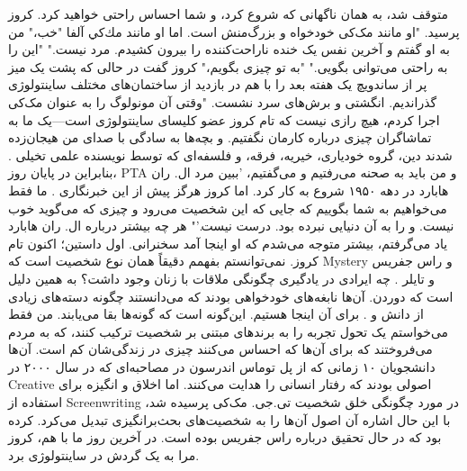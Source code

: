 متوقف شد، به همان ناگهانی که شروع کرد، و شما احساس راحتی خواهید کرد.
کروز پرسید.
"او مانند مک‌کی خودخواه و بزرگ‌منش است. اما او مانند مك‌كي آلفا
"خب،" من به او گفتم و آخرین نفس یک خنده ناراحت‌کننده را بیرون کشیدم.
مرد نیست."
"این را به راحتی می‌توانی بگویی."
"به تو چیزی بگویم،" کروز گفت در حالی که پشت یک میز پر از ساندویچ
یک هفته بعد را با هم در بازدید از ساختمان‌های مختلف ساینتولوژی گذراندیم.
انگشتی و برش‌های سرد نشست. "وقتی آن مونولوگ را به عنوان مک‌کی اجرا کردم،
هیچ رازی نیست که تام کروز عضو کلیسای ساینتولوژی است—یک
ما به تماشاگران چیزی درباره کارمان نگفتیم. و بچه‌ها به سادگی با صدای من هیجان‌زده شدند
دین، گروه خودیاری، خیریه، فرقه، و فلسفه‌ای که توسط نویسنده علمی تخیلی
. بنابراین در پایان روز، PTA و من باید به صحنه می‌رفتیم و می‌گفتیم، 'ببین مرد
ال. ران هابارد در دهه ۱۹۵۰ شروع به کار کرد. اما کروز هرگز پیش از این خبرنگاری
. ما فقط می‌خواهیم به شما بگوییم که جایی که این شخصیت می‌رود و چیزی که می‌گوید خوب نیست. و
را به آن دنیایی نبرده بود.
درست نیست.'"
هر چه بیشتر درباره ال. ران هابارد یاد می‌گرفتم، بیشتر متوجه می‌شدم که او
اینجا آمد سخنرانی. اول داستین؛ اکنون تام کروز. نمی‌توانستم بفهمم
دقیقاً همان نوع شخصیت است که Mystery و راس جفریس و تایلر
. چه ایرادی در یادگیری چگونگی ملاقات با زنان وجود داشت؟ به همين دليل است كه
دوردن. آن‌ها نابغه‌های خودخواهی بودند که می‌دانستند چگونه دسته‌های زیادی از دانش و
. برای آن اینجا هستیم. این‌گونه است که گونه‌ها بقا می‌یابند. من فقط می‌خواستم یک تحول
تجربه را به برندهای مبتنی بر شخصیت ترکیب کنند، که به مردم می‌فروختند
که برای آن‌ها که احساس می‌کنند چیزی در زندگی‌شان کم است. آن‌ها دانشجویان
۱۰ زمانی که از پل توماس اندرسون در مصاحبه‌ای که در سال ۲۰۰۰ در Creative
اصولی بودند که رفتار انسانی را هدایت می‌کنند. اما اخلاق و انگیزه برای استفاده از
Screenwriting در مورد چگونگی خلق شخصیت تی.جی. مک‌کی پرسیده شد، با این حال اشاره
آن اصول آن‌ها را به شخصیت‌های بحث‌برانگیزی تبدیل می‌کرد.
کرده بود که در حال تحقیق درباره راس جفریس بوده است.
در آخرین روز ما با هم، کروز مرا به یک گردش در ساینتولوژی برد.